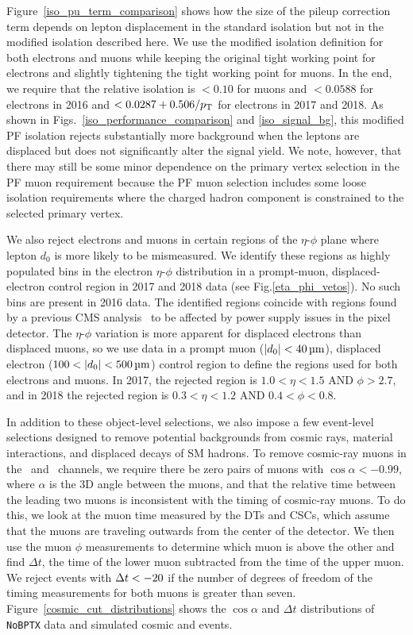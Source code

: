 Figure~\ref{iso_pu_term_comparison} shows how the size of the pileup correction term depends on lepton displacement in the standard isolation but not in the modified isolation described here. We use the modified isolation definition for both electrons and muons while keeping the original tight working point for electrons and slightly tightening the tight working point for muons. In the end, we require that the relative isolation is $<0.10$ for muons and $<0.0588$ for electrons in 2016 and $<0.0287+0.506/p_{\mathrm{T}}$ for electrons in 2017 and 2018. As shown in Figs.~\ref{iso_performance_comparison} and \ref{iso_signal_bg}, this modified PF isolation rejects substantially more background when the leptons are displaced but does not significantly alter the signal yield. We note, however, that there may still be some minor dependence on the primary vertex selection in the PF muon requirement because the PF muon selection includes some loose isolation requirements where the charged hadron component is constrained to the selected primary vertex.



We also reject electrons and muons in certain regions of the $\eta$-$\phi$ plane where lepton $d_0$ is more likely to be mismeasured. We identify these regions as highly populated bins in the electron $\eta$-$\phi$ distribution in a prompt-muon, displaced-electron control region in 2017 and 2018 data (see Fig.\ref{eta_phi_vetos}). No such bins are present in 2016 data. The identified regions coincide with regions found by a previous CMS analysis~\cite{disappearing_tracks} to be affected by power supply issues in the pixel detector. The $\eta$-$\phi$ variation is more apparent for displaced electrons than displaced muons, so we use data in a prompt muon ($\ad<\SI{40}{\um}$), displaced electron ($\num{100}<\ad<\SI{500}{\um}$) control region to define the  regions used for both electrons and muons. In 2017, the rejected region is $1.0<\eta<1.5$ AND $\phi>2.7$, and in 2018 the rejected region is $0.3<\eta<1.2$ AND $0.4<\phi<0.8$.



In addition to these object-level selections, we also impose a few event-level selections designed to remove potential backgrounds from cosmic rays, material interactions, and displaced decays of SM hadrons. To remove cosmic-ray muons in the \Pgm\Pgm\ and \Pe\Pgm\ channels, we require there be zero pairs of muons with $\cos{\alpha}<-0.99$, where $\alpha$ is the 3D angle between the muons, and that the relative time between the leading two muons is inconsistent with the timing of cosmic-ray muons. To do this, we look at the muon time measured by the DTs and CSCs, which assume that the muons are traveling outwards from the center of the detector. We then use the muon $\phi$ measurements to determine which muon is above the other and find $\Delta t$, the time of the lower muon subtracted from the time of the upper muon. We reject events with $\Delta t< -20\ns$ if the number of degrees of freedom of the timing measurements for both muons is greater than seven. Figure~\ref{cosmic_cut_distributions} shows the $\cos{\alpha}$ and $\Delta t$ distributions of \texttt{NoBPTX} data and simulated cosmic and \stoptolb events.

